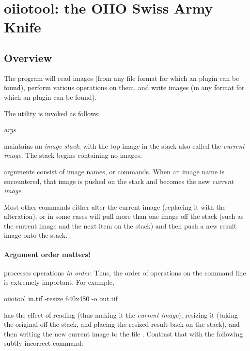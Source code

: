\chapter{{\kw oiiotool}: the OIIO Swiss Army Knife}
\label{chap:oiiotool}

\section{Overview}


The \oiiotool program will read images (from any file format for which
an \ImageInput plugin can be found), perform various operations on them,
and write images (in any format for which an \ImageOutput plugin can be
found).

The \oiiotool utility is invoked as follows:

\medskip

\hspace{0.25in} \oiiotool \emph{args}

\medskip

\oiiotool maintains an \emph{image stack}, with the top image in the
stack also called the \emph{current image}.  The stack begins containing
no images.

\oiiotool arguments consist of image names, or commands.  When an
image name is encountered, that image is pushed on the stack and becomes
the new \emph{current image}.

Most other commands either alter the current image (replacing it with
the alteration), or in some cases will pull more than one image off the
stack (such as the current image and the next item on the stack) and
then push a new result image onto the stack.

\subsubsection*{Argument order matters!}

\oiiotool processes operations \emph{in order}. Thus, the order of operations
on the command line is extremely important. For example,

\begin{code}
    oiiotool in.tif -resize 640x480 -o out.tif
\end{code}

\noindent has the effect of reading  (thus making it the
\emph{current image}), resizing it (taking the original off the stack,
and placing the resized result back on the stack),
and then writing the new current
image to the file .  Contrast that with the following
subtly-incorrect command:

